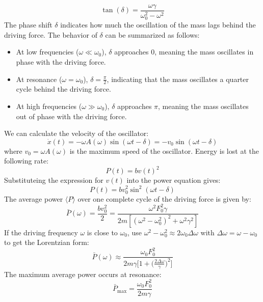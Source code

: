 \documentclass[11pt]{report}
\begin{document}
\begin{definition}
    $$
        \tan(\delta) = \frac{\omega \gamma}{\omega_0^2 - \omega^2}
    $$
    The phase shift \( \delta \) indicates how much the oscillation of the mass lags behind the driving force. The behavior of \( \delta \) can be summarized as follows:
    \begin{itemize}
        \item At low frequencies (\( \omega \ll \omega_0 \)), \( \delta \) approaches 0, meaning the mass oscillates in phase with the driving force.
        \item At resonance (\( \omega = \omega_0 \)), \( \delta = \frac{\pi}{2} \), indicating that the mass oscillates a quarter cycle behind the driving force.
        \item At high frequencies (\( \omega \gg \omega_0 \)), \( \delta \) approaches \( \pi \), meaning the mass oscillates out of phase with the driving force.
    \end{itemize}
\end{definition}

\begin{definition} 
    We can calculate the velocity of the oscillator:
    $$
        \dot{x}(t) = -\omega A(\omega) \sin(\omega t - \delta) = -v_0 \sin(\omega t - \delta)
    $$
    where \( v_0 = \omega A(\omega) \) is the maximum speed of the oscillator. Energy is lost at the following rate:
    $$
        P(t) = b v(t)^2 
    $$
    Substituteing the expression for \( v(t) \) into the power equation gives:
    $$
        P(t) = b v_0^2 \sin^2(\omega t - \delta)
    $$
    The average power \( \langle P \rangle \) over one complete cycle of the driving force is given by:
   \begin{equation}\label{eq:avg_power}
        \bar{P}(\omega) = \frac{b v_0^2}{2} = \frac{\omega^2 F_0^2 \gamma}{2m \left[(\omega^2 - \omega_0^2)^2 + \omega^2 \gamma^2\right]}
   \end{equation}
    If the driving frequency \( \omega \) is close to \( \omega_0 \), use $\omega^2 - \omega_0^2 \approx 2\omega_0\Delta \omega$ with $\Delta \omega = \omega - \omega_0$ to get the Lorentzian form:
    $$
        \bar{P}(\omega) \approx \frac{\omega_0 F_0^2}{2m \gamma \Big[ 1 + \big(\tfrac{2\Delta \omega}{\gamma}\big)^2 \Big]}
    $$
    The maximum average power occurs at resonance:
    $$
        \bar{P}_{\text{max}} = \frac{\omega_0 F_0^2}{2m \gamma}
    $$
\end{definition}
\end{document}
